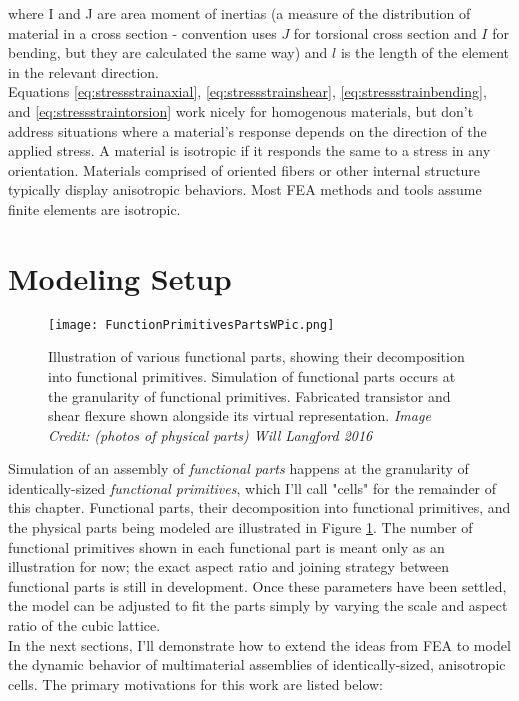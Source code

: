 {where I and J are area moment of inertias (a measure of the distribution of material in a cross section - convention uses $J$ for torsional cross section and $I$ for bending, but they are calculated the same way) and $l$ is the length of the element in the relevant direction.\\

Equations \ref{eq:stressstrainaxial}, \ref{eq:stressstrainshear}, \ref{eq:stressstrainbending}, and \ref{eq:stressstraintorsion} work nicely for homogenous materials, but don't address situations where a material's response depends on the direction of the applied stress.  A material is isotropic if it responds the same to a stress in any orientation.  Materials comprised of oriented fibers or other internal structure typically display anisotropic behaviors.  Most FEA methods and tools assume finite elements are isotropic.

\section{Modeling Setup}

\begin{figure}
  \texttt{[image: FunctionPrimitivesPartsWPic.png]}
  \caption{Illustration of various functional parts, showing their decomposition into functional primitives.  Simulation of functional parts occurs at the granularity of functional primitives.  Fabricated transistor and shear flexure shown alongside its virtual representation.  \textit{Image Credit: (photos of physical parts) Will Langford 2016}}
  \label{fig:FunctionPrimitivesPartsWPic}
\end{figure}

Simulation of an assembly of \textit{functional parts} happens at the granularity of identically-sized \textit{functional primitives}, which I'll call "cells" for the remainder of this chapter.  Functional parts, their decomposition into functional primitives, and the physical parts being modeled are illustrated in Figure \ref{fig:FunctionPrimitivesPartsWPic}.  The number of functional primitives shown in each functional part is meant only as an illustration for now; the exact aspect ratio and joining strategy between functional parts is still in development.  Once these parameters have been settled, the model can be adjusted to fit the parts simply by varying the scale and aspect ratio of the cubic lattice.\\

In the next sections, I'll demonstrate how to extend the ideas from FEA to model the dynamic behavior of multimaterial assemblies of identically-sized, anisotropic cells.  The primary motivations for this work are listed below:\\

}
